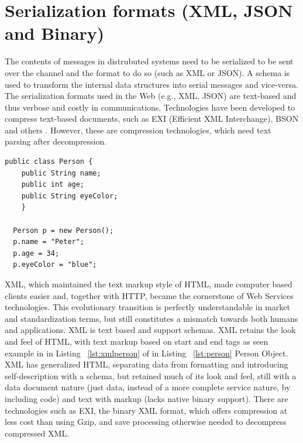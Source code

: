 \section{Serialization formats (XML, JSON and Binary)}
\label{section:xml}
The contents of messages in distrubuted systems need to be serialized to be sent over the channel and the format to do so (such as XML or JSON). A schema is used to transform the internal data structures into serial messages and vice-versa. The serialization formats used in the Web (e.g., XML, JSON) are text-based and thus verbose and costly in communications. Technologies have been developed to compress text-based documents\citep{thesis:state5_3}, such as EXI (Efficient XML Interchange), BSON and others \citep{thesis:state5_4}. However, these are compression technologies, which need text parsing after decompression.
\begin{lstlisting}[caption=Example Person Object Class, label=lst:person]
  public class Person {
    public String name;
    public int age;
    public String eyeColor;
    }

  Person p = new Person();
  p.name = "Peter";
  p.age = 34;
  p.eyeColor = "blue";
\end{lstlisting}

XML, which maintained the text markup style of HTML, made computer based clients easier and, together with HTTP, became the cornerstone of Web Services technologies. This evolutionary transition is perfectly understandable in market and standardization terms, but still constitutes a mismatch towards both humans and applications. XML is text based and support schemas. XML retains the look and feel of HTML, with text markup based on start and end tags as seen example in in Listing ~\ref{lst:xmlperson} of in Listing ~\ref{lst:person} Person Object. XML has generalized HTML, separating data from formatting and introducing self-description with a schema, but retained much of its look and feel, still with a data document nature (just data, instead of a more complete service nature, by including code) and text with markup (lacks native binary support). There are technologies such as  EXI, the binary XML format, which offers compression at less cost than using Gzip, and save processing otherwise needed to decompress compressed XML\citep{thesis:state9}.

